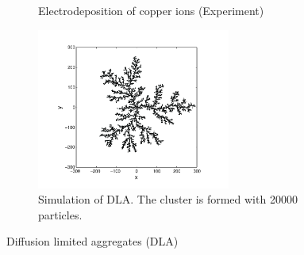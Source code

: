 \begin{figure}
	\centering
	\begin{subfigure}{0.45\textwidth}
		\centering
		\caption{Electrodeposition of copper ions (Experiment)}
		\label{fig:dla_experiment}
	\end{subfigure}
	\begin{subfigure}{0.45\textwidth}
		\centering	
		\includegraphics[width=2.5in]{16.Random-Walk/dla-simulation.pdf}	
		\caption{Simulation of DLA.  The cluster is formed with 20000 particles.}
		\label{fig:dla_simulation}
	\end{subfigure}
	\caption{Diffusion limited aggregates (DLA)}\label{fig:dla}
\end{figure}

